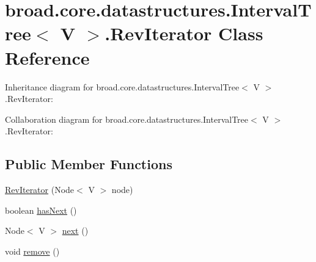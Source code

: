 \hypertarget{classbroad_1_1core_1_1datastructures_1_1_interval_tree_3_01_v_01_4_1_1_rev_iterator}{\section{broad.\+core.\+datastructures.\+Interval\+Tree$<$ V $>$.Rev\+Iterator Class Reference}
\label{classbroad_1_1core_1_1datastructures_1_1_interval_tree_3_01_v_01_4_1_1_rev_iterator}
}


Inheritance diagram for broad.\+core.\+datastructures.\+Interval\+Tree$<$ V $>$.Rev\+Iterator\+:


Collaboration diagram for broad.\+core.\+datastructures.\+Interval\+Tree$<$ V $>$.Rev\+Iterator\+:
\subsection*{Public Member Functions}
\begin{DoxyCompactItemize}
\item 
\hyperlink{classbroad_1_1core_1_1datastructures_1_1_interval_tree_3_01_v_01_4_1_1_rev_iterator_afa393b15b253d2a0698d613d934f6d93}{Rev\+Iterator} (Node$<$ V $>$ node)
\item 
boolean \hyperlink{classbroad_1_1core_1_1datastructures_1_1_interval_tree_3_01_v_01_4_1_1_rev_iterator_a5e94fd5286a149a40f92cd7ec6154b47}{has\+Next} ()
\item 
Node$<$ V $>$ \hyperlink{classbroad_1_1core_1_1datastructures_1_1_interval_tree_3_01_v_01_4_1_1_rev_iterator_a6eecaaf7945f1a2d06470f5310f80142}{next} ()
\item 
void \hyperlink{classbroad_1_1core_1_1datastructures_1_1_interval_tree_3_01_v_01_4_1_1_rev_iterator_a577619fd8cd7ac0c47569a1502ed20bd}{remove} ()
\end{DoxyCompactItemize}


